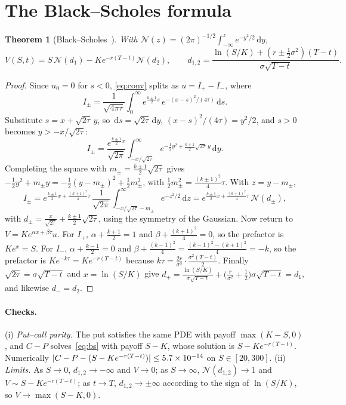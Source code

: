 \documentclass[11pt,a4paper]{article}
\newtheorem{theorem}{Theorem}
\theoremstyle{definition}
\theoremstyle{remark}
\newcommand{\dd}{\,\mathrm{d}}
\newcommand{\N}{\mathcal{N}}
\begin{document}
\section{The Black--Scholes formula}\label{sec:formula}

\begin{theorem}[Black--Scholes~\cite{blackscholes}]\label{thm:bs}
With $\N(z)=(2\pi)^{-1/2}\int_{-\infty}^z e^{-y^2/2}\dd y$,
\[
  V(S,t)=S\,\N(d_1)-Ke^{-r(T-t)}\N(d_2),\qquad
  d_{1,2}=\frac{\ln(S/K)+(r\pm\frac12\sigma^2)(T-t)}{\sigma\sqrt{T-t}} .
\]
\end{theorem}

\begin{proof}
Since $u_0=0$ for $s<0$, \eqref{eq:conv} splits as $u=I_+-I_-$, where
\[
  I_\pm=\frac{1}{\sqrt{4\pi\tau}}\int_0^\infty e^{\frac{k\pm1}{2}s}\,e^{-(x-s)^2/(4\tau)}\dd s .
\]
Substitute $s=x+\sqrt{2\tau}\,y$, so $\dd s=\sqrt{2\tau}\dd y$, $(x-s)^2/(4\tau)=y^2/2$, and $s>0$
becomes $y>-x/\sqrt{2\tau}$:
\[
  I_\pm=\frac{e^{\frac{k\pm1}{2}x}}{\sqrt{2\pi}}\int_{-x/\sqrt{2\tau}}^{\infty}
        e^{-\frac12y^2+\frac{k\pm1}{2}\sqrt{2\tau}\,y}\dd y .
\]
Completing the square with $m_\pm=\frac{k\pm1}{2}\sqrt{2\tau}$ gives
$-\frac12y^2+m_\pm y=-\frac12(y-m_\pm)^2+\frac12m_\pm^2$, with $\frac12m_\pm^2=\frac{(k\pm1)^2}{4}\tau$. With $z=y-m_\pm$,
\[
  I_\pm=e^{\frac{k\pm1}{2}x+\frac{(k\pm1)^2}{4}\tau}\,\frac{1}{\sqrt{2\pi}}\int_{-x/\sqrt{2\tau}-m_\pm}^{\infty}e^{-z^2/2}\dd z
       =e^{\frac{k\pm1}{2}x+\frac{(k\pm1)^2}{4}\tau}\,\N(d_\pm),
\]
with $d_\pm=\frac{x}{\sqrt{2\tau}}+\frac{k\pm1}{2}\sqrt{2\tau}$, using the symmetry of the Gaussian. Now return to
$V=Ke^{\alpha x+\beta\tau}u$. For $I_+$, $\alpha+\frac{k+1}{2}=1$ and $\beta+\frac{(k+1)^2}{4}=0$, so the
prefactor is $Ke^x=S$. For $I_-$, $\alpha+\frac{k-1}{2}=0$ and
$\beta+\frac{(k-1)^2}{4}=\frac{(k-1)^2-(k+1)^2}{4}=-k$, so the prefactor is $Ke^{-k\tau}=Ke^{-r(T-t)}$
because $k\tau=\frac{2r}{\sigma^2}\cdot\frac{\sigma^2(T-t)}{2}$. Finally $\sqrt{2\tau}=\sigma\sqrt{T-t}$ and $x=\ln(S/K)$ give
$d_+=\frac{\ln(S/K)}{\sigma\sqrt{T-t}}+\big(\frac{r}{\sigma^2}+\frac12\big)\sigma\sqrt{T-t}=d_1$, and likewise $d_-=d_2$.
\end{proof}

\paragraph{Checks.} (i) \emph{Put--call parity.} The put satisfies the same PDE with payoff $\max(K-S,0)$,
and $C-P$ solves~\eqref{eq:bs} with payoff $S-K$, whose solution is $S-Ke^{-r(T-t)}$. Numerically
$|C-P-(S-Ke^{-r(T-t)})|\le\num{5.7e-14}$ on $S\in[20,300]$.
(ii) \emph{Limits.} As $S\to0$, $d_{1,2}\to-\infty$ and $V\to0$; as $S\to\infty$, $\N(d_{1,2})\to1$ and
$V\sim S-Ke^{-r(T-t)}$; as $t\to T$, $d_{1,2}\to\pm\infty$ according to the sign of $\ln(S/K)$, so $V\to\max(S-K,0)$.
\end{document}
